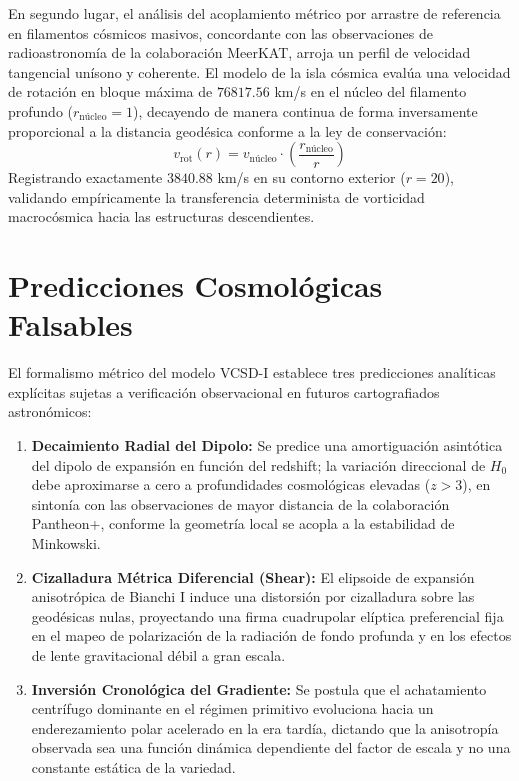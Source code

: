 \documentclass[11pt,a4paper]{article}
\begin{document}
En segundo lugar, el análisis del acoplamiento métrico por arrastre de referencia en filamentos cósmicos masivos, concordante con las observaciones de radioastronomía de la colaboración MeerKAT, arroja un perfil de velocidad tangencial unísono y coherente. El modelo de la isla cósmica evalúa una velocidad de rotación en bloque máxima de $76817.56$ km/s en el núcleo del filamento profundo ($r_{\text{núcleo}} = 1$), decayendo de manera continua de forma inversamente proporcional a la distancia geodésica conforme a la ley de conservación:
\begin{equation}
v_{\text{rot}}(r) = v_{\text{núcleo}} \cdot \left( \frac{r_{\text{núcleo}}}{r} \right)
\end{equation}
Registrando exactamente $3840.88$ km/s en su contorno exterior ($r = 20$), validando empíricamente la transferencia determinista de vorticidad macrocósmica hacia las estructuras descendientes.

\section{Predicciones Cosmológicas Falsables}
El formalismo métrico del modelo VCSD-I establece tres predicciones analíticas explícitas sujetas a verificación observacional en futuros cartografiados astronómicos:
\begin{enumerate}
\item \textbf{Decaimiento Radial del Dipolo:} Se predice una amortiguación asintótica del dipolo de expansión en función del redshift; la variación direccional de $H_0$ debe aproximarse a cero a profundidades cosmológicas elevadas ($z > 3$), en sintonía con las observaciones de mayor distancia de la colaboración Pantheon+, conforme la geometría local se acopla a la estabilidad de Minkowski.
\item \textbf{Cizalladura Métrica Diferencial (Shear):} El elipsoide de expansión anisotrópica de Bianchi I induce una distorsión por cizalladura sobre las geodésicas nulas, proyectando una firma cuadrupolar elíptica preferencial fija en el mapeo de polarización de la radiación de fondo profunda y en los efectos de lente gravitacional débil a gran escala.
\item \textbf{Inversión Cronológica del Gradiente:} Se postula que el achatamiento centrífugo dominante en el régimen primitivo evoluciona hacia un enderezamiento polar acelerado en la era tardía, dictando que la anisotropía observada sea una función dinámica dependiente del factor de escala y no una constante estática de la variedad.
\end{enumerate}
\end{document}
